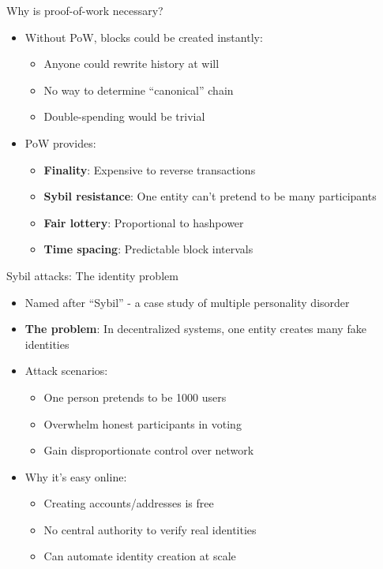 \documentclass[aspectratio=169, lualatex, handout]{beamer}
\begin{document}
\begin{frame}{Why is proof-of-work necessary?}
	\begin{itemize}
		\item Without PoW, blocks could be created instantly:
		      \begin{itemize}
			      \item Anyone could rewrite history at will
			      \item No way to determine ``canonical'' chain
			      \item Double-spending would be trivial
		      \end{itemize}
		\item PoW provides:
		      \begin{itemize}
			      \item \textbf{Finality}: Expensive to reverse transactions
			      \item \textbf{Sybil resistance}: One entity can't pretend to be many participants
			      \item \textbf{Fair lottery}: Proportional to hashpower
			      \item \textbf{Time spacing}: Predictable block intervals
		      \end{itemize}
	\end{itemize}
\end{frame}

\begin{frame}{Sybil attacks: The identity problem}
	\begin{itemize}
		\item Named after ``Sybil'' - a case study of multiple personality disorder
		\item \textbf{The problem}: In decentralized systems, one entity creates many fake identities
		\item Attack scenarios:
		      \begin{itemize}
			      \item One person pretends to be 1000 users
			      \item Overwhelm honest participants in voting
			      \item Gain disproportionate control over network
		      \end{itemize}
		\item Why it's easy online:
		      \begin{itemize}
			      \item Creating accounts/addresses is free
			      \item No central authority to verify real identities
			      \item Can automate identity creation at scale
		      \end{itemize}
	\end{itemize}
\end{frame}
\end{document}
